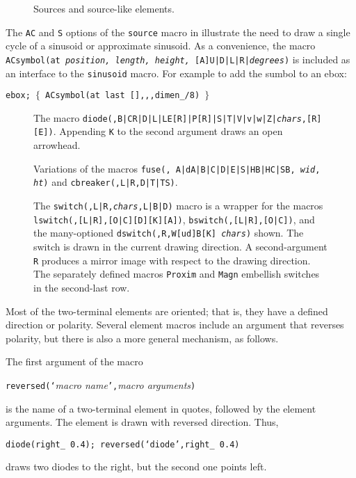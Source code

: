 \begin{figure}[hbt]
   
   \caption{Sources and source-like elements.}
   \label{Sources}
   \end{figure}

The {\tt AC} and {\tt S} options of the {\tt source} macro in 
illustrate the need
to draw a single cycle of a sinusoid or approximate sinusoid.
As a convenience,
the macro {\tt ACsymbol(at {\sl position, length, height,}
  [A]U|D|L|R|{\sl degrees})} is included as an interface to
the {\tt sinusoid} macro.  For example to add the sumbol to an ebox:
\par
{\tt ebox; $\lbrace$\ ACsymbol(at last [],{,},dimen\_/8) $\rbrace$}

\begin{figure}[hbt]
   
   \caption{The macro
     {\tt diode(\linespec,B|CR|D|L|LE[R]|P[R]|S|T|V|v|w|Z|{\sl chars},[R][E])}.
      Appending {\tt K} to the second argument draws an open arrowhead.}
   \label{Diodes}
   \end{figure}

\begin{figure}[t!]
   
   \caption{Variations of the macros
     {\tt fuse(\linespec, A|dA|B|C|D|E|S|HB|HC|SB, {\sl wid}, {\sl ht})}
     and {\tt cbreaker(\linespec,L|R,D|T|TS)}.}
   \label{Fuses}
   \end{figure}
\begin{figure}[t!]
   
   \caption{The
     {\tt switch(\linespec,L|R,{\sl chars},L|B|D)}
     macro is a wrapper for the macros 
     {\tt lswitch(\linespec,[L|R],[O|C][D][K][A])},
     {\tt bswitch(\linespec,[L|R],[O|C])},
     and the many-optioned
     {\tt dswitch(\linespec,R,W[ud]B[K] {\sl chars})} shown.
     The switch is drawn in the current drawing direction.
     A second-argument {\tt R} produces a mirror
     image with respect to the drawing direction.
     The separately defined macros {\tt Proxim} and {\tt Magn}
     embellish switches in the second-last row.}
   \label{Switches}
   \end{figure}

Most of the two-terminal elements are oriented; that is, they have
a defined direction or polarity.  Several element macros include an
argument that reverses polarity, but there is also a more general
mechanism, as follows.

The first argument of the macro
\par
{\tt reversed(`}{\sl macro name}{\tt',}{\sl macro arguments}{\tt )}
\par
\noindent
is the name of a two-terminal element in quotes, followed by the
element arguments.  The element is drawn with reversed direction.
Thus,
\par
{\tt diode(right\_ 0.4); reversed(`diode',right\_ 0.4)}
\par
\noindent
draws two diodes to the right, but the second one points left.

